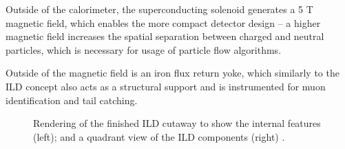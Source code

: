 Outside of the calorimeter, the superconducting solenoid generates a 5 T magnetic field, which enables the more compact detector design -- a higher magnetic field increases the spatial separation between charged and neutral particles, which is necessary for usage of particle flow algorithms.

Outside of the magnetic field is an iron flux return yoke, which similarly to the \acrshort{ILD} concept also acts as a structural support and is instrumented for muon identification and tail catching. 

\begin{figure}[p]%
	\centering
    \qquad
    \caption{Rendering of the finished \acrshort{ILD} cutaway to show the internal features (left); and a quadrant view of the \acrshort{ILD} components (right) \cite{ilc-tdr-detectors}.}%
    \label{figure:colliders/ILD/double}%
\end{figure}


